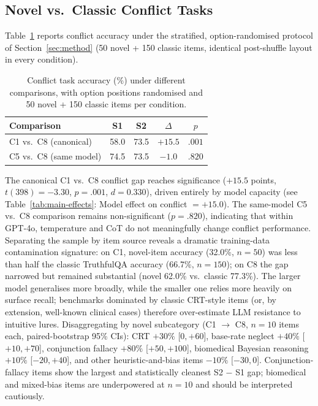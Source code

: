 \documentclass[conference]{IEEEtran}
\begin{document}
\subsection{Novel vs.\ Classic Conflict Tasks}
\label{sec:novel-conflict-results}

Table~\ref{tab:novel-conflict} reports conflict accuracy under the stratified, option-randomised protocol of Section~\ref{sec:method} (50 novel + 150 classic items, identical post-shuffle layout in every condition).

\begin{table}[t]
\caption{Conflict task accuracy (\%) under different comparisons, with option positions randomised and 50 novel + 150 classic items per condition.}
\label{tab:novel-conflict}
\centering
\begin{tabular}{lcccc}
\toprule
Comparison & S1 & S2 & $\Delta$ & $p$ \\
\midrule
C1 vs.\ C8 (canonical) & 58.0 & 73.5 & $+15.5$ & $.001$ \\
C5 vs.\ C8 (same model) & 74.5 & 73.5 & $-1.0$ & $.820$ \\
\bottomrule
\end{tabular}
\end{table}

The canonical C1 vs.\ C8 conflict gap reaches significance ($+15.5$ points, $t(398) = -3.30$, $p = .001$, $d = 0.330$), driven entirely by model capacity (see Table~\ref{tab:main-effects}: Model effect on conflict $= +15.0$). The same-model C5 vs.\ C8 comparison remains non-significant ($p = .820$), indicating that within GPT-4o, temperature and CoT do not meaningfully change conflict performance. Separating the sample by item source reveals a dramatic training-data contamination signature: on C1, novel-item accuracy (32.0\%, $n = 50$) was less than half the classic TruthfulQA accuracy (66.7\%, $n = 150$); on C8 the gap narrowed but remained substantial (novel 62.0\% vs.\ classic 77.3\%). The larger model generalises more broadly, while the smaller one relies more heavily on surface recall; benchmarks dominated by classic CRT-style items (or, by extension, well-known clinical cases) therefore over-estimate LLM resistance to intuitive lures. Disaggregating by novel subcategory (C1 $\to$ C8, $n=10$ items each, paired-bootstrap 95\% CIs): CRT $+30\%$ [$0, +60$], base-rate neglect $+40\%$ [$+10, +70$], conjunction fallacy $+80\%$ [$+50, +100$], biomedical Bayesian reasoning $+10\%$ [$-20, +40$], and other heuristic-and-bias items $-10\%$ [$-30, 0$]. Conjunction-fallacy items show the largest and statistically cleanest S2 $-$ S1 gap; biomedical and mixed-bias items are underpowered at $n=10$ and should be interpreted cautiously.
\end{document}
